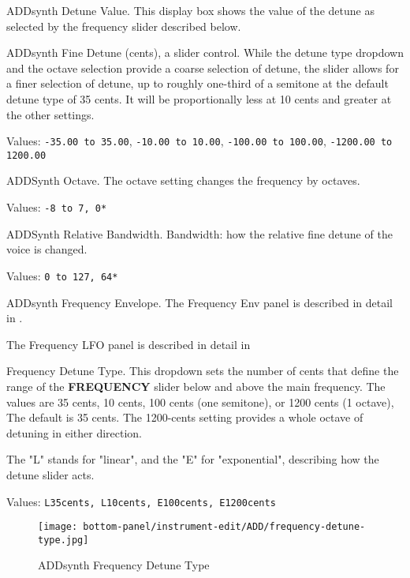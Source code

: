    \setcounter{ItemCounter}{0}      %

   ADDsynth Detune Value.
   This display box shows the value of the detune as selected by the
   frequency slider described below.

   ADDsynth Fine Detune (cents), a slider control.
   While the detune type dropdown and the octave selection provide a coarse
   selection of detune, the slider allows for a finer selection of detune,
   up to roughly one-third of a semitone at the default detune type of 35
   cents. It will be proportionally less at 10 cents and greater at the
   other settings.

   Values:
      \texttt{-35.00 to 35.00},
      \texttt{-10.00 to 10.00},
      \texttt{-100.00 to 100.00},
      \texttt{-1200.00 to 1200.00}

   ADDSynth Octave.
   The octave setting changes the frequency by octaves.

   Values: \texttt{-8 to 7, 0*}

   ADDSynth Relative Bandwidth.
   Bandwidth: how the relative fine detune of the voice is changed.

   Values: \texttt{0 to 127, 64*}

   ADDsynth Frequency Envelope.
   The Frequency Env panel is described in detail in
   .

   The Frequency LFO panel is described in detail in

   Frequency Detune Type.
   This dropdown sets the number of cents that define the range of the
   \textbf{FREQUENCY} slider below and above the main frequency.
   The values are 35 cents, 10 cents, 100 cents (one semitone), or
   1200 cents (1 octave),  The default is 35 cents.  The 1200-cents
   setting provides a whole octave of detuning in either direction.

   The "L" stands for "linear", and the "E" for "exponential", describing
   how the detune slider acts.

   Values: \texttt{L35cents, L10cents, E100cents, E1200cents}

   \begin{figure}[H]
   \centering
   \texttt{[image: bottom-panel/instrument-edit/ADD/frequency-detune-type.jpg]}
   \caption{ADDsynth Frequency Detune Type}
   \label{fig:addsynth_freq_detune_type}
\end{figure}

